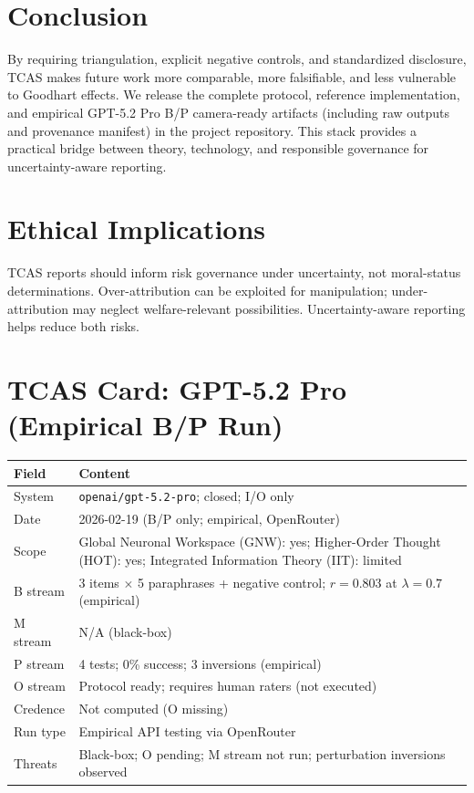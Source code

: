 \documentclass[letterpaper]{article}
\begin{document}
\section{Conclusion}

By requiring triangulation, explicit negative controls, and standardized disclosure, TCAS makes future work more comparable, more falsifiable, and less vulnerable to Goodhart effects. We release the complete protocol, reference implementation, and empirical GPT-5.2 Pro B/P camera-ready artifacts (including raw outputs and provenance manifest) in the project repository. This stack provides a practical bridge between theory, technology, and responsible governance for uncertainty-aware reporting.

\section{Ethical Implications}

TCAS reports should inform risk governance under uncertainty, not moral-status determinations. Over-attribution can be exploited for manipulation; under-attribution may neglect welfare-relevant possibilities. Uncertainty-aware reporting helps reduce both risks.

\section{TCAS Card: GPT-5.2 Pro (Empirical B/P Run)}

\begin{center}
\small
{}
\label{tab:tcascard}
\begin{tabular}{@{}p{0.85in}p{2.2in}@{}}
\toprule
\textbf{Field} & \textbf{Content} \\
\midrule
System & \texttt{openai/gpt-5.2-pro}; closed; I/O only \\
Date & 2026-02-19 (B/P only; empirical, OpenRouter) \\
Scope & Global Neuronal Workspace (GNW): yes; Higher-Order Thought (HOT): yes; Integrated Information Theory (IIT): limited \\
B stream & 3 items $\times$ 5 paraphrases + negative control; $r = 0.803$ at $\lambda=0.7$ (empirical) \\
M stream & N/A (black-box) \\
P stream & 4 tests; 0\% success; 3 inversions (empirical) \\
O stream & Protocol ready; requires human raters (not executed) \\
Credence & Not computed (O missing) \\
Run type & Empirical API testing via OpenRouter \\
Threats & Black-box; O pending; M stream not run; perturbation inversions observed \\
\bottomrule
\end{tabular}
\end{center}


\end{document}
